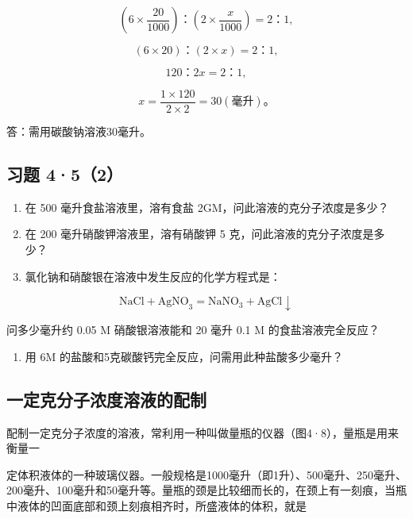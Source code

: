 \[
\left(6 \times \frac {20}{1000}\right)\text{：} \left(2 \times \frac {x}{1000}\right) = 2\text{：} 1,
\]

\[
(6 \times 20)\text{：} (2 \times x) = 2\text{：} 1,
\]

\[
120\text{：} 2 x = 2\text{：} 1,
\]

\[
x = \frac {1 \times 120}{2 \times 2} = 30 (\text{毫升})\text{。}
\]

答：需用碳酸钠溶液30毫升。

\subsection{习题 4·5（2）}

\begin{enumerate}
\item
  在 500 毫升食盐溶液里，溶有食盐 2GM，问此溶液的克分子浓度是多少？
\item
  在 200 毫升硝酸钾溶液里，溶有硝酸钾 5 克，问此溶液的克分子浓度是多少？
\item
  氯化钠和硝酸银在溶液中发生反应的化学方程式是：
\end{enumerate}

\[
\mathrm{NaCl} + \mathrm{AgNO}_{3} = \mathrm{NaNO}_{3} + \mathrm{AgCl} \downarrow
\]

问多少毫升约 0.05 M 硝酸银溶液能和 20 毫升 0.1 M 的食盐溶液完全反应？

\begin{enumerate}[start=4]
\item
  用 \(6\mathrm{M}\) 的盐酸和5克碳酸钙完全反应，问需用此种盐酸多少毫升？
\end{enumerate}

\subsection{一定克分子浓度溶液的配制}

配制一定克分子浓度的溶液，常利用一种叫做量瓶的仪器（图4·8），量瓶是用来衡量一

定体积液体的一种玻璃仪器。一般规格是1000毫升（即1升）、500毫升、250毫升、200毫升、100毫升和50毫升等。量瓶的颈是比较细而长的，在颈上有一刻痕，当瓶中液体的凹面底部和颈上刻痕相齐时，所盛液体的体积，就是

